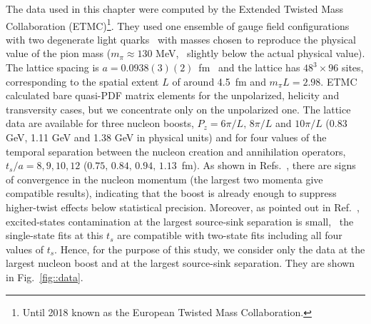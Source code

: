 The data used in this chapter were computed by the Extended Twisted Mass Collaboration
(ETMC)\footnote{Until 2018 known as the European Twisted Mass Collaboration.}.
They used one ensemble of gauge field configurations with two degenerate light
quarks~\cite{Abdel-Rehim:2015pwa} with masses chosen to reproduce the physical
value of the pion mass ($m_\pi\approx130$ MeV, \ie\ slightly below the actual
physical value). The lattice spacing is $a=0.0938(3)(2)$~fm~\cite{Alexandrou:2017xwd} and the lattice has
$48^3 \times 96$ sites, corresponding to the spatial extent $L$ of around 4.5~fm
and $m_\pi L = 2.98$. ETMC calculated bare quasi-PDF matrix elements for the
unpolarized, helicity and transversity cases, but we concentrate only on the
unpolarized one. The lattice data are available for three nucleon boosts,
$P_z=6\pi/L,\,8\pi/L$ and $10\pi/L$ (0.83 GeV, 1.11 GeV and 1.38 GeV in physical
units) and for four values of the temporal separation between the nucleon
creation and annihilation operators, $t_s/a{=}8,9,10,12$ ($0.75,\, 0.84,\,
0.94,\, 1.13$~fm). As shown in Refs.~\cite{Alexandrou:2018pbm,Alexandrou:2019lfo}, there are signs
of convergence in the nucleon momentum (the largest two momenta give compatible
results), indicating that the boost is already enough to suppress higher-twist
effects below statistical precision. Moreover, as pointed out in
Ref.~\cite{Alexandrou:2019lfo}, excited-states contamination at the largest
source-sink separation is small, \ie\ the single-state fits at this $t_s$ are
compatible with two-state fits including all four values of $t_s$. Hence, for
the purpose of this study, we consider only the data at the largest nucleon
boost and at the largest source-sink separation. 
They are shown in Fig.~\ref{fig::data}.

